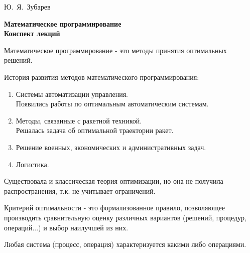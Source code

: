 \documentclass[12pt,a5paper]{scrbook}
\begin{document}
  \pagestyle{plain}
  \begin{titlepage}
    \begin{center}
      \Huge{Ю.~Я.~Зубарев}
    \end{center}
    \vfill
    \vfill
    \begin{center}
      \Large{\textbf{Математическое программирование\\
      Конспект лекций}}
    \end{center}
    \vfill
    \vfill
    \vfill
    \restoregeometry
  \end{titlepage}
  \tableofcontents
  \newpage
  Математическое программирование - это методы принятия оптимальных решений.\par
  История развития методов математического программирования:
  \begin{enumerate}
    \item Системы автоматизации управления.\\Появились работы по оптимальным автоматическим системам.
    \item Методы, связанные с ракетной техникой.\\Решалась задача об оптимальной траектории ракет.
    \item Решение военных, экономических и административных задач.
    \item Логистика.
  \end{enumerate}\par
  Существовала и классическая теория оптимизации, но она не получила распространения, т.к. не учитывает ограничений.\par
  Критерий оптимальности - это формализованное правило, позволяющее производить сравнительную оценку различных вариантов (решений, процедур, операций...) и выбор наилучшей из них.\par
  Любая система (процесс, операция) характеризуется какими либо операциями.\\
  
\end{document}
